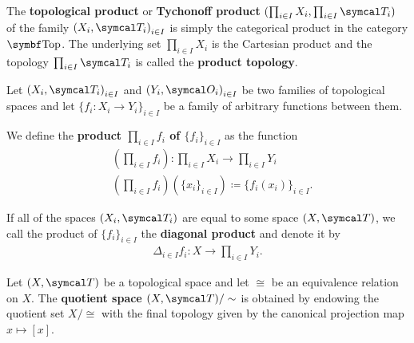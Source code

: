 \begin{definition}\label{def:topological_product}
  The \textbf{topological product} or \textbf{Tychonoff product} \( (\prod_{i \in I} X_i, \prod_{i \in I} \Cal{T}_i) \) of the family \( { (X_i, \Cal{T}_i) }_{i \in I} \) is simply the categorical product in the category \( \Bold{Top} \). The underlying set \( \prod_{i \in I} X_i \) is the Cartesian product and the topology \( \prod_{i \in I} \Cal{T}_i \) is called the \textbf{product topology}.

  Let \( { (X_i, \Cal{T}_i) }_{i \in I} \) and \( { (Y_i, \Cal{O}_i) }_{i \in I} \) be two families of topological spaces and let \( \{ f_i: X_i \to Y_i \}_{i \in I} \) be a family of arbitrary functions between them.

  We define the \textbf{product \( \prod_{i \in I} f_i \) of \( \{ f_i \}_{i \in I} \)} as the function
  \begin{align*}
    &\left(\prod_{i \in I} f_i \right): \prod_{i \in I} X_i \to \prod_{i \in I} Y_i \\
    &\left(\prod_{i \in I} f_i \right)(\{ x_i \}_{i \in I}) \coloneqq \{ f_i (x_i) \}_{i \in I}.
  \end{align*}

  If all of the spaces \( (X_i, \Cal{T}_i) \) are equal to some space \( (X, \Cal{T}) \), we call the product of \( \{ f_i \}_{i \in I} \) the \textbf{diagonal product} and denote it by
  \begin{align*}
    \Delta_{i \in I} f_i: X \to \prod_{i \in I} Y_i.
  \end{align*}
\end{definition}

\begin{definition}\label{def:topological_quotient}\cite[90]{Engelking1989}
  Let \( (X, \Cal{T}) \) be a topological space and let \( \cong \) be an equivalence relation on \( X \). The \textbf{quotient space \( (X, \Cal{T}) / \sim \)} is obtained by endowing the quotient set \( X / \cong \) with the final topology given by the canonical projection map \( x \mapsto [x] \).
\end{definition}

